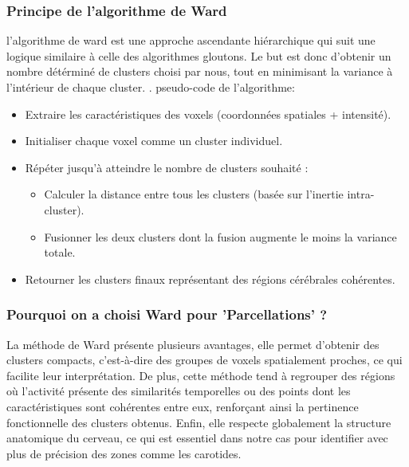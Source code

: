 \documentclass{article}
\begin{document}
                \subsubsection*{Principe de l'algorithme de Ward}
                \vspace{0.2cm}
                l'algorithme de ward est une approche ascendante hiérarchique qui suit une logique similaire à celle des algorithmes gloutons. Le but est donc d’obtenir un nombre détérminé de clusters choisi par nous, tout en minimisant la variance à l’intérieur de chaque cluster.
.           pseudo-code de l'algorithme:
            \begin{itemize}
                \item Extraire les caractéristiques des voxels (coordonnées spatiales + intensité).
                \item Initialiser chaque voxel comme un cluster individuel.
                \item Répéter jusqu'à atteindre le nombre de clusters souhaité :
                \begin{itemize}
                    \item Calculer la distance entre tous les clusters (basée sur l’inertie intra-cluster).
                    \item Fusionner les deux clusters dont la fusion augmente le moins la variance totale.
                \end{itemize}
                \item Retourner les clusters finaux représentant des régions cérébrales cohérentes.
            \end{itemize}

        
            \subsubsection*{Pourquoi on a choisi Ward pour 'Parcellations' ?}
                La méthode de Ward présente plusieurs avantages, elle permet d'obtenir des clusters compacts, c’est-à-dire des groupes de voxels spatialement proches, ce qui facilite leur interprétation. De plus, cette méthode tend à regrouper des régions où l’activité présente des similarités temporelles ou des points dont les caractéristiques sont cohérentes entre eux, renforçant ainsi la pertinence fonctionnelle des clusters obtenus. Enfin, elle respecte globalement la structure anatomique du cerveau, ce qui est essentiel dans notre cas pour identifier avec plus de précision des zones comme les carotides.
\end{document}
